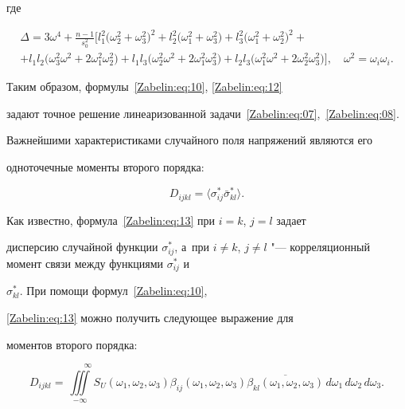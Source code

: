 где

\begin{multline*}

\Delta=3\omega^4+\frac{n-1}{s_0^2}\Big[l_1^2\big(\omega_2^2+\omega_3^2\big)^2+l_2^2\big(\omega_1^2+\omega_3^2\big)+

l_3^2\big(\omega_1^2+\omega_2^2\big)^2+\\

+l_1l_2\big(\omega_3^2\omega^2+2\omega_1^2\omega_2^2\big)+

l_1l_3\big(\omega_2^2\omega^2+2\omega_1^2\omega_3^2\big)+l_2l_3\big(\omega_1^2\omega^2+2\omega_2^2\omega_3^2\big)\Big], \quad \omega^2=\omega_i\omega_i.

\end{multline*}



Таким образом, формулы~\eqref{Zabelin:eq:10}, \eqref{Zabelin:eq:12}

задают точное решение линеаризованной задачи~\eqref{Zabelin:eq:07},~\eqref{Zabelin:eq:08}.



Важнейшими характеристиками случайного поля напряжений являются его

одноточечные моменты второго порядка:

\begin{equation}\label{Zabelin:eq:13}

D_{ijkl}=\langle\sigma_{ij}^*\bar{\sigma}_{kl}^*\rangle.

\end{equation}

Как известно, формула~\eqref{Zabelin:eq:13} при $i=k$, $j=l$ задает

дисперсию случайной функции $\sigma_{ij}^*$, а~при $i\neq k$, $j\neq

l$ "--- корреляционный момент связи между функциями $\sigma_{ij}^*$ и

$\sigma_{kl}^*$. При помощи формул~\eqref{Zabelin:eq:10},

\eqref{Zabelin:eq:13} можно получить следующее выражение для

моментов второго порядка:

\begin{equation}\label{Zabelin:eq:14}

D_{ijkl}=\iiint\limits_{-\infty}^{\phantom{--}\infty}S_U(\omega_1,\omega_2,\omega_3)

\beta_{ij}(\omega_1,\omega_2,\omega_3)\overline{\beta_{kl}(\omega_1,\omega_2,\omega_3)}

\,d\omega_1\,d\omega_2\,d\omega_3.

\end{equation}



